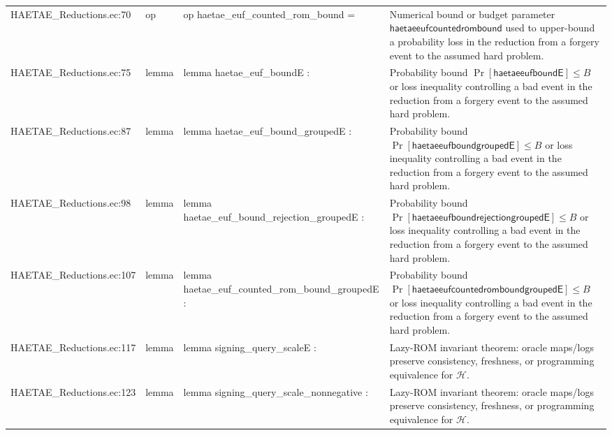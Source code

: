 \documentclass[10pt]{article}
\begin{document}
\begin{longtable}{L{0.11\textwidth}L{0.055\textwidth}L{0.385\textwidth}L{0.41\textwidth}}
HAETAE\_\allowbreak{}Reductions.\allowbreak{}ec:\allowbreak{}70 & op & {\ttfamily\scriptsize op haetae\_\allowbreak{}euf\_\allowbreak{}counted\_\allowbreak{}rom\_\allowbreak{}bound =} & Numerical bound or budget parameter $\mathsf{haetaeeufcountedrombound}$ used to upper-bound a probability loss in the reduction from a forgery event to the assumed hard problem. \\
HAETAE\_\allowbreak{}Reductions.\allowbreak{}ec:\allowbreak{}75 & lemma & {\ttfamily\scriptsize lemma haetae\_\allowbreak{}euf\_\allowbreak{}boundE :} & Probability bound $\Pr[\mathsf{haetaeeufboundE}]\le B$ or loss inequality controlling a bad event in the reduction from a forgery event to the assumed hard problem. \\
HAETAE\_\allowbreak{}Reductions.\allowbreak{}ec:\allowbreak{}87 & lemma & {\ttfamily\scriptsize lemma haetae\_\allowbreak{}euf\_\allowbreak{}bound\_\allowbreak{}groupedE :} & Probability bound $\Pr[\mathsf{haetaeeufboundgroupedE}]\le B$ or loss inequality controlling a bad event in the reduction from a forgery event to the assumed hard problem. \\
HAETAE\_\allowbreak{}Reductions.\allowbreak{}ec:\allowbreak{}98 & lemma & {\ttfamily\scriptsize lemma haetae\_\allowbreak{}euf\_\allowbreak{}bound\_\allowbreak{}rejection\_\allowbreak{}groupedE :} & Probability bound $\Pr[\mathsf{haetaeeufboundrejectiongroupedE}]\le B$ or loss inequality controlling a bad event in the reduction from a forgery event to the assumed hard problem. \\
HAETAE\_\allowbreak{}Reductions.\allowbreak{}ec:\allowbreak{}107 & lemma & {\ttfamily\scriptsize lemma haetae\_\allowbreak{}euf\_\allowbreak{}counted\_\allowbreak{}rom\_\allowbreak{}bound\_\allowbreak{}groupedE :} & Probability bound $\Pr[\mathsf{haetaeeufcountedromboundgroupedE}]\le B$ or loss inequality controlling a bad event in the reduction from a forgery event to the assumed hard problem. \\
HAETAE\_\allowbreak{}Reductions.\allowbreak{}ec:\allowbreak{}117 & lemma & {\ttfamily\scriptsize lemma signing\_\allowbreak{}query\_\allowbreak{}scaleE :} & Lazy-ROM invariant theorem: oracle maps/logs preserve consistency, freshness, or programming equivalence for $\mathcal H$. \\
HAETAE\_\allowbreak{}Reductions.\allowbreak{}ec:\allowbreak{}123 & lemma & {\ttfamily\scriptsize lemma signing\_\allowbreak{}query\_\allowbreak{}scale\_\allowbreak{}nonnegative :} & Lazy-ROM invariant theorem: oracle maps/logs preserve consistency, freshness, or programming equivalence for $\mathcal H$. \\

\end{longtable}
\end{document}
